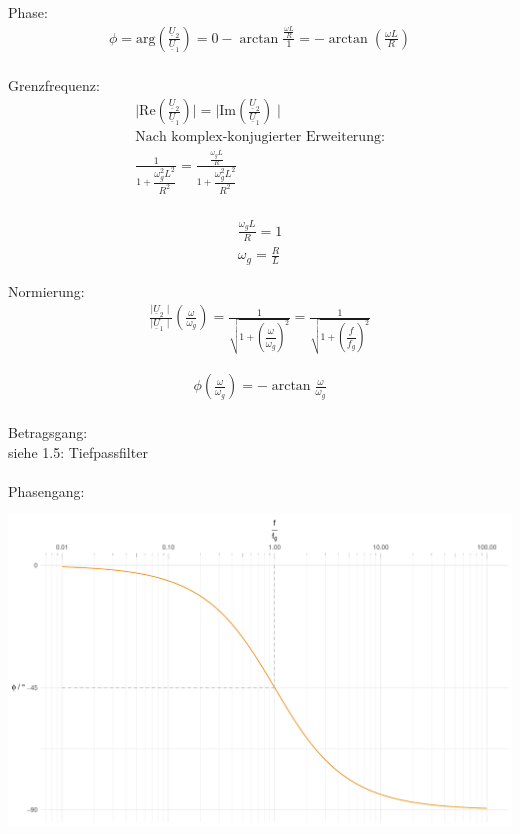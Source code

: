 \documentclass[a4paper, 12pt]{article}
\begin{document}
    Phase:
      \begin{gather*}
        \phi = \text{arg} \left( \frac{ \underline{U}_2 }{ \underline{U}_1 } \right) = 0 - \arctan{\frac{ \frac{\omega L}{R} }{1}} = -\arctan{\left(\frac{\omega L}{R}\right)}\\
      \end{gather*}

    Grenzfrequenz:
      \begin{gather*}
        \mid \text{Re}\left( \frac{ \underline{U}_2 }{ \underline{U}_1 } \right) \mid = \mid \text{Im}\left( \frac{ \underline{U}_2 }{ \underline{U}_1 } \right) \mid\\
        \text{Nach komplex-konjugierter Erweiterung:}\\
        \frac{1}{1 + \dfrac{\omega_g^2 L^2}{R^2} } = \frac{ \frac{\omega_g L}{R} }{1 + \dfrac{\omega_g^2 L^2}{R^2} }\\
      \end{gather*}

      \begin{gather*}
        \frac{\omega_g L}{R} = 1\\
        \omega_g = \frac{R}{L}
      \end{gather*}

    Normierung:
      \begin{gather*}
        \frac{\mid \underline{U}_2 \mid}{\mid \underline{U}_1 \mid} \left( \frac{\omega}{\omega_g} \right) = \frac{1}{\sqrt{1+ \left (\dfrac{\omega}{\omega_g} \right)^2}} = \frac{1}{\sqrt{1+\left (\dfrac{f}{f_g} \right)^2}}
      \end{gather*}

      \begin{gather*}
        \phi \left( \frac{\omega}{\omega_g} \right) = -\arctan{ \frac{\omega}{\omega_g} }
      \end{gather*} \\

      Betragsgang: \\ \indent \indent siehe 1.5: Tiefpassfilter\\\\
      \indent Phasengang:
        \begin{center}
          \includegraphics[scale=0.5]{./R/RC_LP/RC_LP_phase_clean.pdf}
        \end{center}
\end{document}
